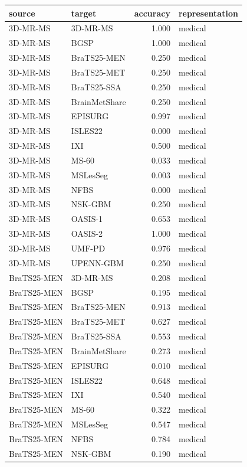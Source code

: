 \begin{tabular}{llrl}
\toprule
source & target & accuracy & representation \\
\midrule
3D-MR-MS & 3D-MR-MS & 1.000 & medical \\
3D-MR-MS & BGSP & 1.000 & medical \\
3D-MR-MS & BraTS25-MEN & 0.250 & medical \\
3D-MR-MS & BraTS25-MET & 0.250 & medical \\
3D-MR-MS & BraTS25-SSA & 0.250 & medical \\
3D-MR-MS & BrainMetShare & 0.250 & medical \\
3D-MR-MS & EPISURG & 0.997 & medical \\
3D-MR-MS & ISLES22 & 0.000 & medical \\
3D-MR-MS & IXI & 0.500 & medical \\
3D-MR-MS & MS-60 & 0.033 & medical \\
3D-MR-MS & MSLesSeg & 0.003 & medical \\
3D-MR-MS & NFBS & 0.000 & medical \\
3D-MR-MS & NSK-GBM & 0.250 & medical \\
3D-MR-MS & OASIS-1 & 0.653 & medical \\
3D-MR-MS & OASIS-2 & 1.000 & medical \\
3D-MR-MS & UMF-PD & 0.976 & medical \\
3D-MR-MS & UPENN-GBM & 0.250 & medical \\
BraTS25-MEN & 3D-MR-MS & 0.208 & medical \\
BraTS25-MEN & BGSP & 0.195 & medical \\
BraTS25-MEN & BraTS25-MEN & 0.913 & medical \\
BraTS25-MEN & BraTS25-MET & 0.627 & medical \\
BraTS25-MEN & BraTS25-SSA & 0.553 & medical \\
BraTS25-MEN & BrainMetShare & 0.273 & medical \\
BraTS25-MEN & EPISURG & 0.010 & medical \\
BraTS25-MEN & ISLES22 & 0.648 & medical \\
BraTS25-MEN & IXI & 0.540 & medical \\
BraTS25-MEN & MS-60 & 0.322 & medical \\
BraTS25-MEN & MSLesSeg & 0.547 & medical \\
BraTS25-MEN & NFBS & 0.784 & medical \\
BraTS25-MEN & NSK-GBM & 0.190 & medical \\

\end{tabular}

